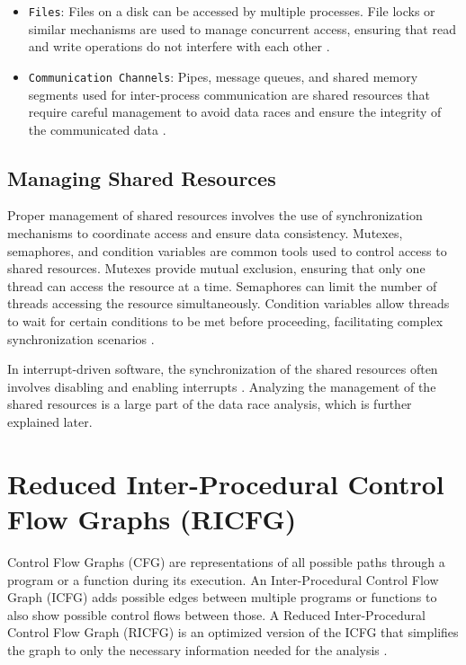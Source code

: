 \documentclass[
fancyheadings, %
%
%
]{stsreprt}
\begin{document}
{\begin{itemize}
	\item \texttt{Files}: Files on a disk can be accessed by multiple processes. File locks or similar mechanisms are used to manage concurrent access, ensuring that read and write operations do not interfere with each other \cite{labrosse2002}.
	
	\item \texttt{Communication Channels}: Pipes, message queues, and shared memory segments used for inter-process communication are shared resources that require careful management to avoid data races and ensure the integrity of the communicated data \cite{herlihy2008}.
\end{itemize}

\subsection{Managing Shared Resources}
Proper management of shared resources involves the use of synchronization mechanisms to coordinate access and ensure data consistency. Mutexes, semaphores, and condition variables are common tools used to control access to shared resources. Mutexes provide mutual exclusion, ensuring that only one thread can access the resource at a time. Semaphores can limit the number of threads accessing the resource simultaneously. Condition variables allow threads to wait for certain conditions to be met before proceeding, facilitating complex synchronization scenarios \cite{herlihy2008}.

In interrupt-driven software, the synchronization of the shared resources often involves disabling and enabling interrupts \cite{chopra2019}. Analyzing the management of the shared resources is a large part of the data race analysis, which is further explained later.

\section{Reduced Inter-Procedural Control Flow Graphs (RICFG)}
Control Flow Graphs (CFG) are representations of all possible paths through a program or a function during its execution. An Inter-Procedural Control Flow Graph (ICFG) adds possible edges between multiple programs or functions to also show possible control flows between those.
A Reduced Inter-Procedural Control Flow Graph (RICFG) is an optimized version of the ICFG that simplifies the graph to only the necessary information needed for the analysis \cite{engler2003}.

\begin{figure}[H]
	\centering
	\begin{tikzpicture}[node distance=2cm, scale=0.85, transform shape]
		

\end{tikzpicture}
\end{figure}}
\end{document}
